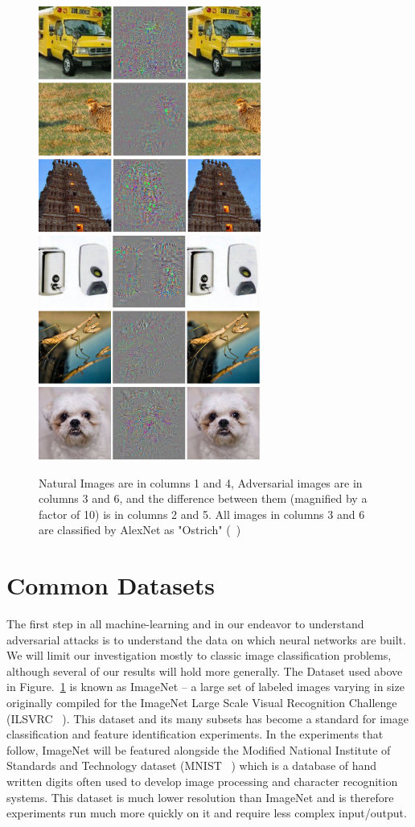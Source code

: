 \begin{figure}[H]
    \centering
\includegraphics[width=7.3cm]{c1_figures/negative1.png}\includegraphics[width=7.3cm]{c1_figures/negative2.png}
    \caption{Natural Images are in columns 1 and 4, Adversarial images are in columns 3 and 6, and the difference between them (magnified by a factor of 10) is in columns 2 and 5. All images in columns 3 and 6 are classified by AlexNet as "Ostrich" (~\cite{szegedy2013})}
    \label{fig:szegedy}
\end{figure}

\section{Common Datasets}

The first step in all machine-learning and in our endeavor to
understand adversarial attacks is to understand the data on which
neural networks are built. We will limit our investigation mostly to
classic image classification problems, although several of our results
will hold more generally. The Dataset used above in
Figure.~\ref{fig:szegedy} is known as ImageNet -- a large set of
labeled images varying in size originally compiled for the ImageNet
Large Scale Visual Recognition Challenge (ILSVRC ~\cite{ILSVRC15}). This
dataset and its many subsets has become a standard for image
classification and feature identification experiments. In the
experiments that follow, ImageNet will be featured alongside the
Modified National Institute of Standards and Technology dataset (MNIST ~\cite{}) which is a database of hand written digits often used to develop image processing and character recognition systems. This dataset is much lower resolution than ImageNet and is therefore experiments run much more quickly on it and require less complex input/output.  

